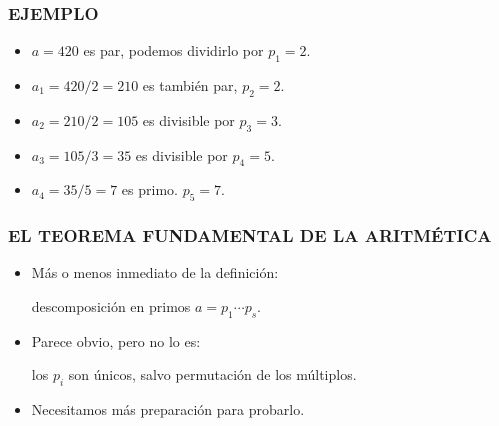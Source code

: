\begin{frame}
  \frametitle{EJEMPLO}

  \begin{itemize}
  \item<2-> $a = 420$ es par, podemos dividirlo por $p_1 = 2$.

  \item<3-> $a_1 = 420/2 = 210$ es también par, $p_2 = 2$.

  \item<4-> $a_2 = 210/2 = 105$ es divisible por $p_3 = 3$.

  \item<5-> $a_3 = 105/3 = 35$ es divisible por $p_4 = 5$.

  \item<6-> $a_4 = 35/5 = 7$ es primo. $p_5 = 7$.
  \end{itemize}


\end{frame}

\begin{frame}
  \frametitle{EL TEOREMA FUNDAMENTAL DE LA ARITMÉTICA}

  \begin{itemize}
  \item<2-> Más o menos inmediato de la definición:

    descomposición en primos $a = p_1 \cdots p_s$.

  \item<3-> Parece obvio, pero no lo es:

    los $p_i$ son únicos, salvo permutación de los múltiplos.

  \item<4-> Necesitamos más preparación para probarlo.
  \end{itemize}
\end{frame}

